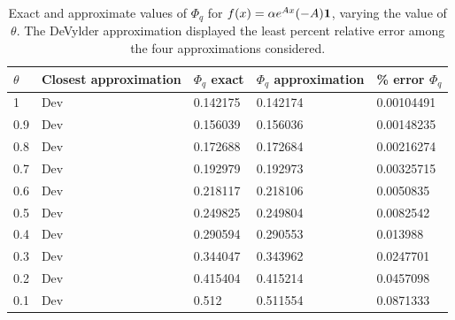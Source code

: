 \begin{table}[!h]
\begin{tabular}{|l|l|l|l|l|}
\hline
$\theta$ & Closest approximation & $\Phi_q$   exact & $\Phi_q$ approximation & \% error   $\Phi_q$ \\ \hline
1   & Dev                     & 0.142175       & 0.142174 & 0.00104491        \\ \hline
0.9 & Dev                     & 0.156039       & 0.156036 & 0.00148235        \\ \hline
0.8 & Dev                     & 0.172688       & 0.172684 & 0.00216274        \\ \hline
0.7 & Dev                     & 0.192979       & 0.192973 & 0.00325715        \\ \hline
0.6 & Dev                     & 0.218117       & 0.218106 & 0.0050835         \\ \hline
0.5 & Dev                     & 0.249825       & 0.249804 & 0.0082542         \\ \hline
0.4 & Dev                     & 0.290594       & 0.290553 & 0.013988          \\ \hline
0.3 & Dev                     & 0.344047       & 0.343962 & 0.0247701         \\ \hline
0.2 & Dev                     & 0.415404       & 0.415214 & 0.0457098         \\ \hline
0.1 & Dev                     & 0.512          & 0.511554 & 0.0871333         \\ \hline
\end{tabular}
\caption{Exact and approximate values of $\Phi_q$ for $f(x)=\alpha e^{A x} (-A) {\mbox{\boldmath$1$}} $, varying the value of $\theta$. The DeVylder approximation displayed the least percent relative error among the four approximations considered.}
\label{table:MatExp6220Phiq}
\end{table}



